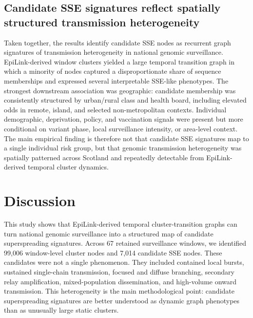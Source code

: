\documentclass[10pt,letterpaper]{article}
\begin{document}
\subsection*{Candidate SSE signatures reflect spatially structured transmission heterogeneity}

Taken together, the results identify candidate SSE nodes as recurrent graph signatures of transmission heterogeneity in national genomic surveillance. EpiLink-derived window clusters yielded a large temporal transition graph in which a minority of nodes captured a disproportionate share of sequence memberships and expressed several interpretable SSE-like phenotypes. The strongest downstream association was geographic: candidate membership was consistently structured by urban/rural class and health board, including elevated odds in remote, island, and selected non-metropolitan contexts. Individual demographic, deprivation, policy, and vaccination signals were present but more conditional on variant phase, local surveillance intensity, or area-level context. The main empirical finding is therefore not that candidate SSE signatures map to a single individual risk group, but that genomic transmission heterogeneity was spatially patterned across Scotland and repeatedly detectable from EpiLink-derived temporal cluster dynamics.

\section*{Discussion}

This study shows that EpiLink-derived temporal cluster-transition graphs can turn national genomic surveillance into a structured map of candidate superspreading signatures. Across 67 retained surveillance windows, we identified 99,006 window-level cluster nodes and 7,014 candidate SSE nodes. These candidates were not a single phenomenon. They included contained local bursts, sustained single-chain transmission, focused and diffuse branching, secondary relay amplification, mixed-population dissemination, and high-volume onward transmission. This heterogeneity is the main methodological point: candidate superspreading signatures are better understood as dynamic graph phenotypes than as unusually large static clusters.
\end{document}
